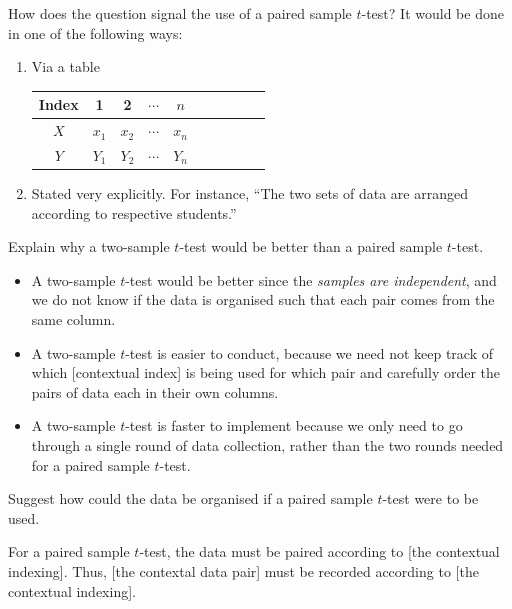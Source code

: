 \begin{note}
  How does the question signal the use of a paired sample \(t\)-test? It would be done in one of the following ways:
  \begin{enumerate}[label=(\alph*)]
    \item Via a table
    \begin{center}
      \begin{tabular}{|Sc|Sc|Sc|Sc|Sc|}
        \hline
         Index & 1 & 2 & \(\cdots\) & \(n\)\\
        \hline
        \(X\) & \(x_1\) & \(x_2\) & \(\cdots\) & \(x_n\)\\
        \hline
        \(Y\) & \(Y_1\) & \(Y_2\) & \(\cdots\) & \(Y_n\)\\
        \hline
      \end{tabular}
      \captionsetup{type=table}
      \label{table:table containing data of two paired samples}
    \end{center}
    \item Stated very explicitly. For instance, ``The two sets of data are arranged according to respective students.''
  \end{enumerate}
\end{note}
\begin{note}
  Explain why a two-sample \(t\)-test would be better than a paired sample \(t\)-test.
  \begin{itemize}
    \item A two-sample \(t\)-test would be better since the \emph{samples are independent}, and we do not know if the data is organised such that each pair comes from the same column.
    \item A two-sample \(t\)-test is easier to conduct, because we need not keep track of which [contextual index] is being used for which pair and carefully order the pairs of data each in their own columns.  
    \item A two-sample \(t\)-test is faster to implement because we only need to go through a single round of data collection, rather than the two rounds needed for a paired sample \(t\)-test. 
  \end{itemize}
\end{note}
\begin{note}
  Suggest how could the data be organised if a paired sample \(t\)-test were to be used.
  \begin{center}
    \parbox{0.9\textwidth}{
      For a paired sample \(t\)-test, the data must be paired according to [the contextual indexing]. Thus, [the contextal data pair] must be recorded according to [the contextual indexing].
    }
  \end{center}
\end{note}
